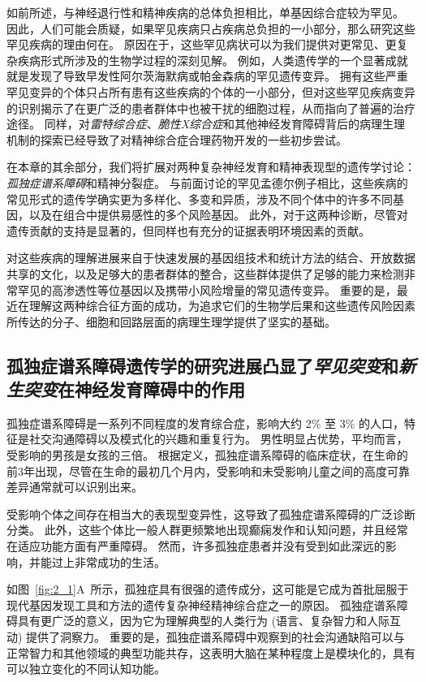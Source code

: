 如前所述，与神经退行性和精神疾病的总体负担相比，单基因综合症较为罕见。
因此，人们可能会质疑，如果罕见疾病只占疾病总负担的一小部分，那么研究这些罕见疾病的理由何在。
原因在于，这些罕见病状可以为我们提供对更常见、更复杂疾病形式所涉及的生物学过程的深刻见解。
例如，人类遗传学的一个显著成就就是发现了导致早发性阿尔茨海默病或帕金森病的罕见遗传变异。
拥有这些严重罕见变异的个体只占所有患有这些疾病的个体的一小部分，但对这些罕见疾病变异的识别揭示了在更广泛的患者群体中也被干扰的细胞过程，从而指向了普遍的治疗途径。
同样，对\textit{雷特综合症}、\textit{脆性X综合症}和其他神经发育障碍背后的病理生理机制的探索已经导致了对精神综合症合理药物开发的一些初步尝试。


在本章的其余部分，我们将扩展对两种复杂神经发育和精神表现型的遗传学讨论：\textit{孤独症谱系障碍}和精神分裂症。
与前面讨论的罕见孟德尔例子相比，这些疾病的常见形式的遗传学确实更为多样化、多变和异质，涉及不同个体中的许多不同基因，以及在组合中提供易感性的多个风险基因。
此外，对于这两种诊断，尽管对遗传贡献的支持是显著的，但同样也有充分的证据表明环境因素的贡献。


对这些疾病的理解进展来自于快速发展的基因组技术和统计方法的结合、开放数据共享的文化，以及足够大的患者群体的整合，这些群体提供了足够的能力来检测非常罕见的高渗透性等位基因以及携带小风险增量的常见遗传变异。
重要的是，最近在理解这两种综合征方面的成功，为追求它们的生物学后果和这些遗传风险因素所传达的分子、细胞和回路层面的病理生理学提供了坚实的基础。




\subsection{孤独症谱系障碍遗传学的研究进展凸显了\textit{罕见突变}和\textit{新生突变}在神经发育障碍中的作用}

孤独症谱系障碍是一系列不同程度的发育综合症，影响大约 2\% 至 3\% 的人口，特征是社交沟通障碍以及模式化的兴趣和重复行为。
男性明显占优势，平均而言，受影响的男孩是女孩的三倍。
根据定义，孤独症谱系障碍的临床症状，在生命的前3年出现，尽管在生命的最初几个月内，受影响和未受影响儿童之间的高度可靠差异通常就可以识别出来。



受影响个体之间存在相当大的表现型变异性，这导致了孤独症谱系障碍的广泛诊断分类。
此外，这些个体比一般人群更频繁地出现癫痫发作和认知问题，并且经常在适应功能方面有严重障碍。
然而，许多孤独症患者并没有受到如此深远的影响，并能过上非常成功的生活。



如图~\ref{fig:2_1}A~所示，孤独症具有很强的遗传成分，这可能是它成为首批屈服于现代基因发现工具和方法的遗传复杂神经精神综合症之一的原因。
孤独症谱系障碍具有更广泛的意义，因为它为理解典型的人类行为 (语言、复杂智力和人际互动) 提供了洞察力。
重要的是，孤独症谱系障碍中观察到的社会沟通缺陷可以与正常智力和其他领域的典型功能共存，这表明大脑在某种程度上是模块化的，具有可以独立变化的不同认知功能。


